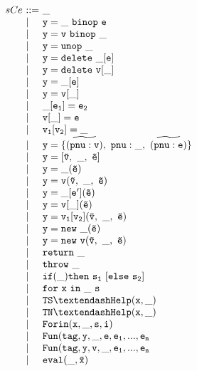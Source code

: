 \documentclass[a4paper, leqno]{amsart}
\begin{document}
\[\begin{array}{l@{}l@{}ll}
sCe & \ ::= \ & {\tt \_ \ } & \\
 & \ \mid \ & {\tt y = \_ \ binop\ e} & \\
 & \ \mid \ & {\tt y = v\ binop\ \_} & \\
 & \ \mid \ & {\tt y = unop\ \_} & \\
 & \ \mid \ & {\tt y = delete\ \_[e]} & \\
 & \ \mid \ & {\tt y = delete\ v[\_]} & \\
 & \ \mid \ & {\tt y = \_[e]} & \\
 & \ \mid \ & {\tt y = v[\_]} & \\
 & \ \mid \ & {\tt \_[e_1] = e_2} & \\
 & \ \mid \ & {\tt v[\_] = e} & \\
 & \ \mid \ & {\tt v_1[v_2] = \_} & \\
 & \ \mid \ & {\tt y = \{\widetilde{(pnu:v)},\ pnu: \_,\ \widetilde{(pnu:e)}\} } & \\
 & \ \mid \ & {\tt y = [\tilde{v},\ \_, \ \tilde{e}]} & \\
 & \ \mid \ & {\tt y = \_(\tilde{e})} & \\
 & \ \mid \ & {\tt y = v(\tilde{v},\ \_, \ \tilde{e})} & \\
 & \ \mid \ & {\tt y = \_[e'](\tilde{e})} & \\
 & \ \mid \ & {\tt y = v[\_](\tilde{e})} & \\
 & \ \mid \ & {\tt y = v_1[v_2](\tilde{v},\ \_, \ \tilde{e})} & \\
 & \ \mid \ & {\tt y = new\ \_(\tilde{e})} & \\
 & \ \mid \ & {\tt y = new\ v(\tilde{v},\ \_, \ \tilde{e})} & \\
 & \ \mid \ & {\tt return\ \_} & \\
 & \ \mid \ & {\tt throw\ \_} & \\
 & \ \mid \ & {\tt if(\_)then\ s_1\ [else\ s_2]} & \\
 & \ \mid \ & {\tt for\ x \ in\ \_\ s} & \\
 & \ \mid \ & {\tt TS\textendash Help(x,\_)} & \\
 & \ \mid \ & {\tt TN\textendash Help(x,\_)} & \\
 & \ \mid \ & {\tt Forin(x,\_,s,i)} & \\
 & \ \mid \ & {\tt Fun(tag,y,\_,e,e_1,...,e_n} & \\
 & \ \mid \ & {\tt Fun(tag,y,v,\_,e_1,...,e_n} & \\
 & \ \mid \ & {\tt eval(\_,\tilde{x})} & \\

\end{array}\]
\end{document}
